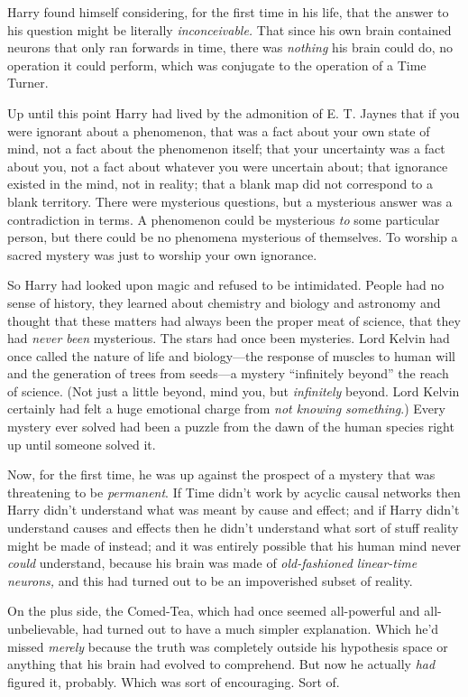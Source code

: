 Harry found himself considering, for the first time in his life, that the answer to his question might be literally \emph{inconceivable.} That since his own brain contained neurons that only ran forwards in time, there was \emph{nothing} his brain could do, no operation it could perform, which was conjugate to the operation of a Time Turner.

Up until this point Harry had lived by the admonition of E. T. Jaynes that if you were ignorant about a phenomenon, that was a fact about your own state of mind, not a fact about the phenomenon itself; that your uncertainty was a fact about you, not a fact about whatever you were uncertain about; that ignorance existed in the mind, not in reality; that a blank map did not correspond to a blank territory. There were mysterious questions, but a mysterious answer was a contradiction in terms. A phenomenon could be mysterious \emph{to} some particular person, but there could be no phenomena mysterious of themselves. To worship a sacred mystery was just to worship your own ignorance.

So Harry had looked upon magic and refused to be intimidated. People had no sense of history, they learned about chemistry and biology and astronomy and thought that these matters had always been the proper meat of science, that they had \emph{never been} mysterious. The stars had once been mysteries. Lord Kelvin had once called the nature of life and biology—the response of muscles to human will and the generation of trees from seeds—a mystery “infinitely beyond” the reach of science. (Not just a little beyond, mind you, but \emph{infinitely} beyond. Lord Kelvin certainly had felt a huge emotional charge from \emph{not knowing something}.) Every mystery ever solved had been a puzzle from the dawn of the human species right up until someone solved it.

Now, for the first time, he was up against the prospect of a mystery that was threatening to be \emph{permanent}. If Time didn’t work by acyclic causal networks then Harry didn’t understand what was meant by cause and effect; and if Harry didn’t understand causes and effects then he didn’t understand what sort of stuff reality might be made of instead; and it was entirely possible that his human mind never \emph{could} understand, because his brain was made of \emph{old-fashioned linear-time neurons,} and this had turned out to be an impoverished subset of reality.

On the plus side, the Comed-Tea, which had once seemed all-powerful and all-unbelievable, had turned out to have a much simpler explanation. Which he’d missed \emph{merely} because the truth was completely outside his hypothesis space or anything that his brain had evolved to comprehend. But now he actually \emph{had} figured it, probably. Which was sort of encouraging. Sort of.

